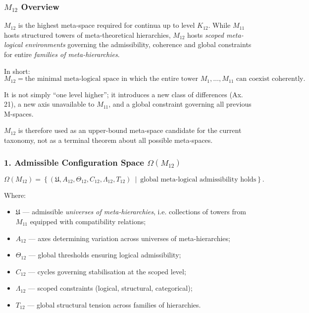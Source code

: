 

\subsubsection{$M_{12}$ Overview}
\label{sec:m12-overview}

$M_{12}$ is the highest meta-space required for continua up to level $K_{12}$.
While $M_{11}$ hosts structured towers of meta-theoretical hierarchies,
$M_{12}$ hosts \emph{scoped meta-logical environments} governing the
admissibility, coherence and global constraints for entire \emph{families of
meta-hierarchies}.

In short:
\[
M_{12} = \text{the minimal meta-logical space in which the entire tower }
M_1, \ldots, M_{11} \text{ can coexist coherently.}
\]

It is not simply “one level higher”;
it introduces a new class of differences (Ax. 21),
a new axis unavailable to $M_{11}$,
and a global constraint governing all previous M-spaces.

$M_{12}$ is therefore used as an upper-bound meta-space candidate for the current taxonomy, not as a terminal theorem about all possible meta-spaces.

\subsubsection*{1. Admissible Configuration Space $\Omega(M_{12})$}

\[
\Omega(M_{12}) =
\left\{
\left( \mathfrak{U}, A_{12}, \Theta_{12},
C_{12}, \Lambda_{12}, T_{12} \right)
\ \middle|\
\text{global meta-logical admissibility holds}
\right\}.
\]

Where:

\begin{itemize}
    \item $\mathfrak{U}$ — admissible \emph{universes of meta-hierarchies},
          i.e. collections of towers from $M_{11}$ equipped with compatibility relations;
    \item $A_{12}$ — axes determining variation across universes of meta-hierarchies;
    \item $\Theta_{12}$ — global thresholds ensuring logical admissibility;
    \item $C_{12}$ — cycles governing stabilisation at the scoped level;
    \item $\Lambda_{12}$ — scoped constraints (logical, structural, categorical);
    \item $T_{12}$ — global structural tension across families of hierarchies.
\end{itemize}

